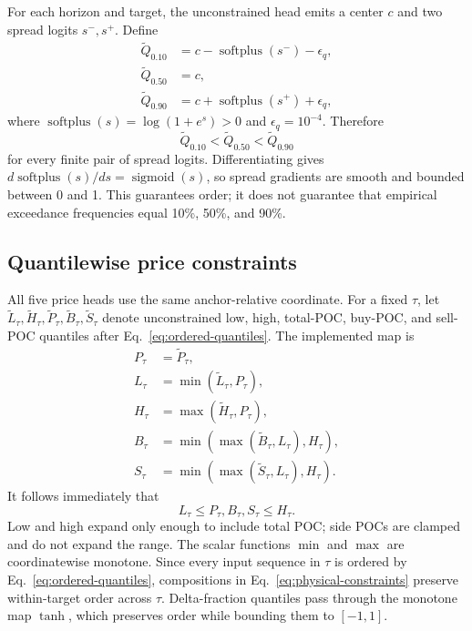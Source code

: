 \documentclass[10pt]{article}
\newcommand{\softplus}{\operatorname{softplus}}
\newcommand{\sigmoid}{\operatorname{sigmoid}}
\begin{document}
For each horizon and target, the unconstrained head emits a center $c$ and two spread logits
$s^-,s^+$. Define
\begin{align}
\widetilde Q_{0.10}&=c-\softplus(s^-)-\epsilon_q,\\
\widetilde Q_{0.50}&=c,\\
\widetilde Q_{0.90}&=c+\softplus(s^+)+\epsilon_q,
\label{eq:ordered-quantiles}
\end{align}
where $\softplus(s)=\log(1+e^s)>0$ and $\epsilon_q=10^{-4}$. Therefore
\begin{equation}
\widetilde Q_{0.10}<\widetilde Q_{0.50}<\widetilde Q_{0.90}
\end{equation}
for every finite pair of spread logits. Differentiating gives
$d\softplus(s)/ds=\sigmoid(s)$, so spread gradients are smooth and bounded between 0 and 1. This
guarantees order; it does not guarantee that empirical exceedance frequencies equal 10\%, 50\%, and
90\%.

\subsection{Quantilewise price constraints}

All five price heads use the same anchor-relative coordinate. For a fixed $\tau$, let
$\widetilde L_\tau,\widetilde H_\tau,\widetilde P_\tau,
\widetilde B_\tau,\widetilde S_\tau$ denote unconstrained low, high, total-POC, buy-POC, and sell-POC
quantiles after Eq.~\eqref{eq:ordered-quantiles}. The implemented map is
\begin{align}
P_\tau&=\widetilde P_\tau,\\
L_\tau&=\min(\widetilde L_\tau,P_\tau),\\
H_\tau&=\max(\widetilde H_\tau,P_\tau),\\
B_\tau&=\min\!\left(\max(\widetilde B_\tau,L_\tau),H_\tau\right),\\
S_\tau&=\min\!\left(\max(\widetilde S_\tau,L_\tau),H_\tau\right).
\label{eq:physical-constraints}
\end{align}
It follows immediately that
\begin{equation}
L_\tau\le P_\tau,B_\tau,S_\tau\le H_\tau.
\end{equation}
Low and high expand only enough to include total POC; side POCs are clamped and do not expand the
range. The scalar functions $\min$ and $\max$ are coordinatewise monotone. Since every input sequence
in $\tau$ is ordered by Eq.~\eqref{eq:ordered-quantiles}, compositions in
Eq.~\eqref{eq:physical-constraints} preserve within-target order across $\tau$. Delta-fraction
quantiles pass through the monotone map $\tanh$, which preserves order while bounding them to
$[-1,1]$.
\end{document}

